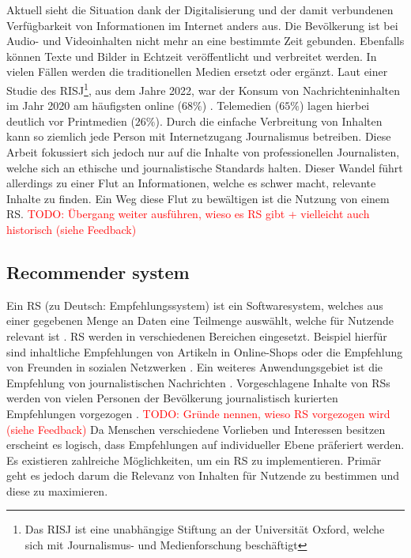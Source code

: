 Aktuell sieht die Situation dank der Digitalisierung und der damit verbundenen Verfügbarkeit von Informationen im Internet anders aus.
Die Bevölkerung ist bei Audio- und Videoinhalten nicht mehr an eine bestimmte Zeit gebunden.
Ebenfalls können Texte und Bilder in Echtzeit veröffentlicht und verbreitet werden.
In vielen Fällen werden die traditionellen Medien ersetzt oder ergänzt.
Laut einer Studie des \ac{RISJ}\footnote{Das \ac{RISJ} ist eine unabhängige Stiftung an der Universität Oxford, welche sich mit Journalismus- und Medienforschung beschäftigt}, aus dem Jahre 2022, war der Konsum von Nachrichteninhalten im Jahr 2020 am häufigsten online ($68\%$) \cite{reuters-2022}.
Telemedien ($65\%$) lagen hierbei deutlich vor Printmedien ($26\%$).
Durch die einfache Verbreitung von Inhalten kann so ziemlich jede Person mit Internetzugang Journalismus betreiben.
Diese Arbeit fokussiert sich jedoch nur auf die Inhalte von professionellen Journalisten, welche sich an ethische und journalistische Standards halten.
Dieser Wandel führt allerdings zu einer Flut an Informationen, welche es schwer macht, relevante Inhalte zu finden.
Ein Weg diese Flut zu bewältigen ist die Nutzung von einem \ac{RS}.
\textcolor{red}{TODO: Übergang weiter ausführen, wieso es RS gibt + vielleicht auch historisch (siehe Feedback)}

\subsection{Recommender system}
Ein \acf{RS} (zu Deutsch: Empfehlungssystem) ist ein Softwaresystem, welches aus einer gegebenen Menge an Daten eine Teilmenge auswählt, welche für Nutzende relevant ist \cite{recommender-systems}.
\ac{RS} werden in verschiedenen Bereichen eingesetzt.
Beispiel hierfür sind inhaltliche Empfehlungen von Artikeln in Online-Shops oder die Empfehlung von Freunden in sozialen Netzwerken \cite{ecommerce-recommender, social-recommender}.
Ein weiteres Anwendungsgebiet ist die Empfehlung von journalistischen Nachrichten \cite{news-recommender}.
Vorgeschlagene Inhalte von \acp{RS} werden von vielen Personen der Bevölkerung journalistisch kurierten Empfehlungen vorgezogen \cite{recommender-preference, theory-of-machine}.
\textcolor{red}{TODO: Gründe nennen, wieso RS vorgezogen wird (siehe Feedback)}
Da Menschen verschiedene Vorlieben und Interessen besitzen erscheint es logisch, dass Empfehlungen auf individueller Ebene präferiert werden.
Es existieren zahlreiche Möglichkeiten, um ein \ac{RS} zu implementieren.
Primär geht es jedoch darum die Relevanz von Inhalten für Nutzende zu bestimmen und diese zu maximieren. \\

